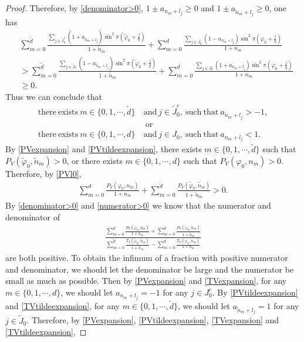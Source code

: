 \documentclass[12pt]{amsart}
\theoremstyle{plain}
\theoremstyle{definition}
\begin{document}
\begin{proof}
Therefore, by \eqref{denominator>0}, $ 1\pm a_{n_m+l_j}\geq0$ and $1\pm a_{\tilde{n}_m+l_j}\geq0$, one has
\begin{align}
	&\sum_{m=0}^{\tilde{d}}\frac{\sum_{j\in \tilde{J}_0^c}(1+a_{\tilde{n}_m+l_j})\sin^2\pi\left(\tilde{\varphi}_0+\frac{j}{q}\right)}{1+\tilde{n}_{m}}+\sum_{m=0}^{d}\frac{\sum_{j\in J_0}\left(1-a_{n_m+l_j}\right)\sin^2\pi\left(\varphi_0+\frac{j}{q}\right)}{1+n_{m}}\nonumber\\
	&>\sum_{m=0}^{\tilde{d}}\frac{\sum_{j\in \tilde{J}_0}(1-a_{\tilde{n}_m+l_j})\sin^2\pi\left(\tilde{\varphi}_0+\frac{j}{q}\right)}{1+\tilde{n}_{m}}+\sum_{m=0}^{d}\frac{\sum_{j\in J_0^c}\left(1+a_{n_m+l_j}\right)\sin^2\pi\left(\varphi_0+\frac{j}{q}\right)}{1+n_{m}}\nonumber\\
	&\geq 0.\nonumber
\end{align}
Thus we can conclude that 
\begin{align}
	\mathrm{there\ exists\ }m\in\{0,1,\cdots,\tilde{d}\}\ &\mathrm{and}\ j\in \tilde{J}_0^c,\ \mathrm{such\ that}\ a_{\tilde{n}_m+l_j}>-1,\label{fis1}\\
	&\ \mathrm{or}\nonumber\\
	\mathrm{there\ exists\ }m\in\{0,1,\cdots,{d}\}\ &\mathrm{and}\ j\in {J}_0,\ \mathrm{such\ that}\ a_{{n}_m+l_j}<1.\label{fis2}
\end{align}
By \eqref{PVexpansion} and \eqref{PVtildeexpansion}, there exists $m\in\{0,1,\cdots,\tilde{d}\}$ such that $	P_V(\tilde{\varphi}_0,\tilde{n}_m)>0$, or there exists $m\in\{0,1,\cdots,{d}\}$ such that $P_V(\varphi_0,n_m)>0$. Therefore, by \eqref{PVl0},
\begin{align}
	\sum_{m=0}^{d}\frac{P_V(\varphi_0,n_{m})}{1+n_{m}}+\sum_{m=0}^{\tilde{d}}\frac{P_V(\tilde{\varphi}_0,\tilde{n}_{m})}{1+\tilde{n}_{m}}>0.\label{numerator>0}
\end{align}
By \eqref{denominator>0} and \eqref{numerator>0} we know that the numerator and denominator of 
\begin{align}
	\frac{\sum_{m=0}^{d}\frac{P_V(\varphi_0,n_{m})}{1+n_{m}}+\sum_{m=0}^{\tilde{d}}\frac{P_V(\tilde{\varphi}_0,\tilde{n}_{m})}{1+\tilde{n}_{m}}}{{\sum_{m=0}^{\tilde{d}}\frac{T_V(\tilde{\varphi}_0,\tilde{n}_{m})}{1+\tilde{n}_{m}}-\sum_{m=0}^{d}\frac{T_V(\varphi_0,n_{m})}{1+n_{m}}}}\nonumber
\end{align}
are both positive. To obtain the infimum of a fraction with positive numerator and denominator, we should let the denominator be large and the numerator be small as much as possible. Then by \eqref{PVexpansion} and \eqref{TVexpansion}, for any $m\in\{0,1,\cdots,d\}$, we should let  $a_{n_m+l_j}=-1$ for any $j\in J_0^c$. By \eqref{PVtildeexpansion} and \eqref{TVtildeexpansion},  for any $m\in\{0,1,\cdots,\tilde{d}\}$, we should let $a_{\tilde{n}_m+l_j}=1$ for  any $j\in \tilde{J}_0$. Therefore, by \eqref{PVexpansion}, \eqref{PVtildeexpansion}, \eqref{TVexpansion} and \eqref{TVtildeexpansion},

\end{proof}
\end{document}
